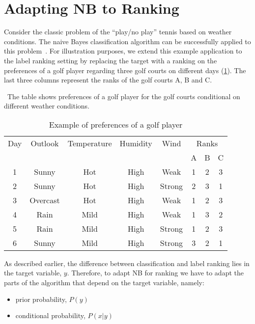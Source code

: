 \documentclass[a4paper,12pt,openright,notitlepage]{report}\usepackage[]{graphicx}\usepackage[]{color}
\begin{document}
\section{Adapting NB to Ranking}
\label{ch2-sec:adapting}
Consider the classic problem of the ``play/no play'' tennis based on  weather conditions. The naive Bayes classification algorithm can be successfully applied to this problem~\citep[chap. 6]{mitchell1997}. For illustration purposes, we extend this example application to the label ranking setting by replacing the target with a ranking on the preferences of a golf player regarding three golf courts on different days (\ref{ch2-tab01}). The last three columns represent the ranks of the golf courts A, B and C.

\begin{table}
\caption{Example of preferences of a golf player}
\ The table shows preferences of a golf player for the golf courts conditional on different weather conditions. 
\begin{center}
\begin{tabular}{cccccccc}
\toprule
Day&Outlook&Temperature&Humidity&Wind&\multicolumn{3}{c}{Ranks}\\
\cline{6-8}
&&&&&A&B&C\\
\midrule
 1 & Sunny & Hot & High & Weak &   1 &   2 &   3 \\ 
  2 & Sunny & Hot & High & Strong &   2 &   3 &   1 \\ 
  3 & Overcast & Hot & High & Weak &   1 &   2 &   3 \\ 
  4 & Rain & Mild & High & Weak &   1 &   3 &   2 \\ 
  5 & Rain & Mild & High & Strong &   1 &   2 &   3 \\ 
  6 & Sunny & Mild & High & Strong &   3 &   2 &   1 \\ 
  
\bottomrule
\end{tabular}
\end{center}
\label{ch2-tab01}
\end{table}

As described earlier, the difference between classification and label ranking lies in the target variable, $y$. Therefore, to adapt NB for ranking we have to adapt the parts of the algorithm that depend on the target variable, namely:
\begin{itemize}
\item prior probability, $P(y)$
\item conditional probability, $P(x|y)$
\end{itemize}
\end{document}
